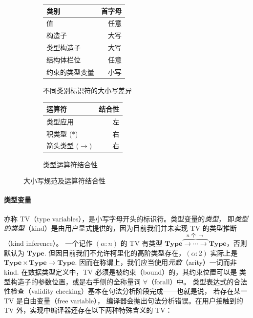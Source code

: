 \begin{figure}
  \centering
  \begin{subfigure}[t]{0.5\textwidth}\centering
    \caption{不同类别标识符的大小写差异}\label{tab:ident-case}
    \begin{tabular}{@{}lr@{}}
      \toprule
      \textbf{类别}             & \textbf{首字母} \\ \midrule
      值               & 任意          \\
      构造子         & 大写    \\
      类型构造子    & 大写    \\
      结构体栏位        & 任意          \\
      约束的类型变量 & 小写    \\ \bottomrule
    \end{tabular}
  \end{subfigure}%
  \begin{subfigure}[t]{0.5\textwidth}\centering
    \caption{类型运算符结合性}\label{tab:tyoperator-prec}
    \begin{tabular}{@{}lr@{}}
      \toprule
      \textbf{运算符}                     & \textbf{结合性} \\ \midrule
      类型应用             & 左         \\
      积类型 (\(\ast\))             & 右         \\
      箭头类型 (\(\to\)) & 右 \\ \bottomrule
    \end{tabular}
  \end{subfigure}
  \caption{大小写规范及运算符结合性}
\end{figure}

\paragraph*{类型变量}\label{fn:HKT} 亦称 TV（type variables），是小写字母开头的标识符。类型变量的\emph{类型}，
即\emph{类型的类型}（kind）是由用户显式提供的，因为目前我们并未实现 TV 的类型推断（kind inference）。
一个记作 \((\alpha : n)\) 的 TV 有类型 \(\mathbf{Type}\overbrace{\to\cdots\to}^{n\text{ 个 }\to}\mathbf{Type}\)，否则默认为 $\mathbf{Type}$.
但因目前我们不允许柯里化的高阶类型存在，\((\alpha : 2)\) 实际上是 \(\mathbf{Type}\times\mathbf{Type}\to\mathbf{Type}\).
因而在称谓上，我们应当使用\emph{元数}（arity）一词而非 kind. 在数据类型定义中，TV 必须是被约束（bound）的，其约束位置可以是
类型构造子的参数位置，或是右手侧的全称量词 $\forall$（forall）中。
类型表达式的合法性检查（validity checking）基本在句法分析阶段完成——也就是说，
若存在某一 TV 是自由变量（free variable），
编译器会抛出句法分析错误。在用户接触到的 TV 外，实现中编译器还存在以下两种特殊含义的 TV：

